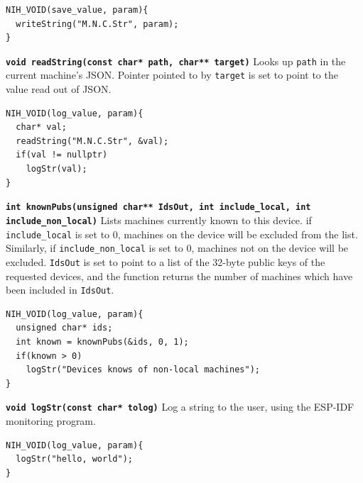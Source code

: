 \documentclass{article}
\begin{document}
\begin{tcolorbox}[colback=white,grow to left by=2.5mm,grow to right by=2.5mm,left*=0mm,right*=0mm,sharp corners]
\begin{verbatim}
NIH_VOID(save_value, param){
  writeString("M.N.C.Str", param);
}
\end{verbatim}
\end{tcolorbox}

\textbf{\texttt{void readString(const char* path, char** target)}}\newline
Looks up \texttt{path} in the current machine's JSON. Pointer pointed to by \texttt{target} is set to point to the value read out of JSON.

\begin{tcolorbox}[colback=white,grow to left by=2.5mm,grow to right by=2.5mm,left*=0mm,right*=0mm,sharp corners]
\begin{verbatim}
NIH_VOID(log_value, param){
  char* val;
  readString("M.N.C.Str", &val);
  if(val != nullptr)
    logStr(val);
}
\end{verbatim}
\end{tcolorbox}

\textbf{\texttt{int knownPubs(unsigned char** IdsOut, int include\_local, int include\_non\_local)}}\newline
Lists machines currently known to this device. if \texttt{include\_local} is set to 0, machines on the device will be excluded from the list. Similarly, if \texttt{include\_non\_local} is set to 0, machines not on the device will be excluded. \texttt{IdsOut} is set to point to a list of the 32-byte public keys of the requested devices, and the function returns the number of machines which have been included in \texttt{IdsOut}.

\begin{tcolorbox}[colback=white,grow to left by=2.5mm,grow to right by=2.5mm,left*=0mm,right*=0mm,sharp corners]
\begin{verbatim}
NIH_VOID(log_value, param){
  unsigned char* ids;
  int known = knownPubs(&ids, 0, 1);
  if(known > 0)
    logStr("Devices knows of non-local machines");
}
\end{verbatim}
\end{tcolorbox}

\textbf{\texttt{void logStr(const char* tolog)}}\newline
Log a string to the user, using the ESP-IDF monitoring program.

\begin{tcolorbox}[colback=white,grow to left by=2.5mm,grow to right by=2.5mm,left*=0mm,right*=0mm,sharp corners]
\begin{verbatim}
NIH_VOID(log_value, param){
  logStr("hello, world");
}
\end{verbatim}
\end{tcolorbox}
\end{document}
